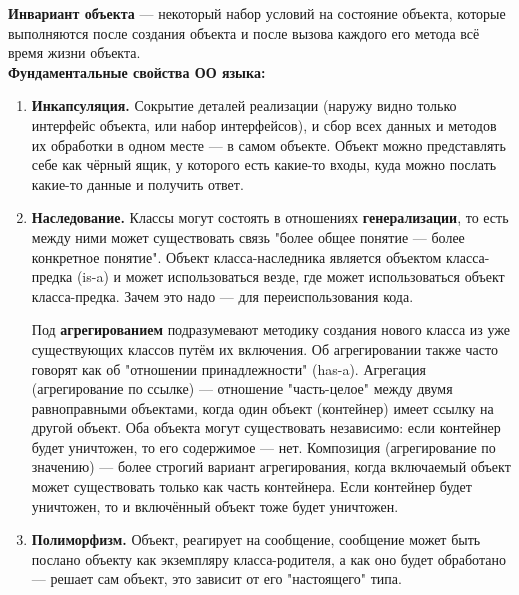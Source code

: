 \documentclass[12pt, a4paper]{article}
\begin{document}
\textbf{Инвариант объекта} — некоторый набор условий на состояние объекта, которые выполняются после создания объекта и после вызова каждого его метода всё время жизни объекта.\\

\textbf{Фундаментальные свойства ОО языка:}
\begin{enumerate}
    \item \textbf{Инкапсуляция.} Сокрытие деталей реализации (наружу видно только интерфейс объекта, или набор интерфейсов), и сбор всех данных и методов их обработки в одном месте — в самом объекте. Объект можно представлять себе как чёрный ящик, у которого есть какие-то входы, куда можно послать какие-то данные и получить ответ.
    \item \textbf{Наследование.} Классы могут состоять в отношениях \textbf{генерализации}, то есть между ними может существовать связь "более общее понятие — более конкретное понятие"{}. Объект класса-наследника является объектом класса-предка (is-a) и может использоваться везде, где может использоваться объект класса-предка. Зачем это надо — для переиспользования кода.
    
    Под \textbf{агрегированием} подразумевают методику создания нового класса из уже существующих классов путём их включения. Об агрегировании также часто говорят как об "отношении принадлежности"{} (has-a). Агрегация (агрегирование по ссылке) — отношение "часть-целое"{} между двумя равноправными объектами, когда один объект (контейнер) имеет ссылку на другой объект. Оба объекта могут существовать независимо: если контейнер будет уничтожен, то его содержимое — нет. Композиция (агрегирование по значению) — более строгий вариант агрегирования, когда включаемый объект может существовать только как часть контейнера. Если контейнер будет уничтожен, то и включённый объект тоже будет уничтожен.
    \item \textbf{Полиморфизм.} Объект, реагирует на сообщение, сообщение может быть послано объекту как экземпляру класса-родителя, а как оно будет обработано — решает сам объект, это зависит от его "настоящего"{} типа. 
\end{enumerate}
\end{document}
